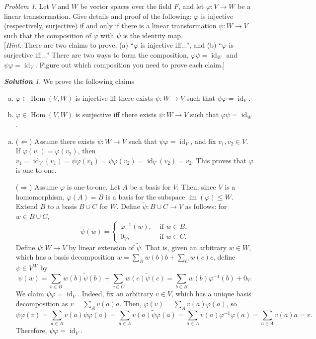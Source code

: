 \documentclass[11pt]{paper}
\theoremstyle{remark}
\newtheorem{problem}{Problem}
\newtheorem*{solution}{{\bf Solution}}
\newcommand\0{\ensuremath{\mathbf{0}}}
\newcommand{\<}{\ensuremath{\langle}}
\renewcommand{\>}{\ensuremath{\rangle}}
\newcommand\Hom{\ensuremath{\operatorname{Hom}}}
\newcommand{\id}{\ensuremath{\operatorname{id}}}
\newcommand\im[1]{\ensuremath{\operatorname{im}(#1)}}
\renewcommand{\phi}{\ensuremath{\varphi}}
\renewcommand{\leq}{\ensuremath{\leqslant}}
\begin{document}
\begin{problem}
Let $V$ and $W$ be vector spaces over the field $F$, and let 
$\phi : V \rightarrow W$ be a linear transformation. Give details and proof of
the following: $\phi$ is injective (respectively, surjective) if and only if 
there is a linear transformation $\psi: W \rightarrow V$ such that the
composition of $\phi$ with $\psi$ is the identity map.\\[4pt]
[{\it Hint:} There are two claims to prove, (a) ``$\phi$
  is injective iff...'', and (b) ``$\phi$ is surjective
  iff...'' There are two ways to form the composition, 
$\phi \psi = \id_W$ and $\psi \phi = \id_V$. Figure out which composition
you need to prove each claim.]
\end{problem}
\begin{solution} We prove the following claims 
  \begin{enumerate}[(a)]
  \item $\phi\in \Hom(V,W)$ is injective iff there exists $\psi: W\rightarrow V$ such that $\psi \phi = \id_V$.
  \item $\phi\in \Hom(V,W)$ is surjective iff there exists $\psi: W\rightarrow V$ such that $\phi \psi = \id_W$.
  \end{enumerate}
  \begin{enumerate}[(a)]
  \item ($\Leftarrow$) Assume there exists $\psi: W\rightarrow V$ such that
    $\psi \phi = \id_V$, and fix $v_1, v_2 \in V$. 
    If $\phi(v_1) = \phi(v_2)$, then $v_1 =  \id_V(v_1) = \psi \phi(v_1) =\psi \phi(v_2) =
    \id_V(v_2) =  v_2$. This proves that $\phi$ is one-to-one.

($\Rightarrow$) Assume $\phi$ is one-to-one.  Let $A$ be a basis for
    $V$.  Then, since $V$ is a homomorphism, $\phi(A) = B$ is a basis for the
    subspace $\im \phi \leq W$.  Extend $B$ to a basis $B\cup C$ for $W$.
    Define $\tilde{\psi}: B\cup C \rightarrow V$ as follows: for $w\in B\cup C$,
\[
\tilde\psi (w) =
\begin{cases}
  \phi^{-1}(w), & \text{ if $w \in B$,}\\
0_V, & \text{ if $w \in C$.}
\end{cases}
\]
Define $\psi: W \rightarrow V$ by linear extension of $\tilde \psi$.  That is,
given an arbitrary $w \in W$, which has a basis decomposition 
$w = \sum_B w(b) b +\sum_C w(c) c$, define $\psi \in V^W$ by 
\[
\psi(w) = \sum_{b\in B} w(b) \tilde{\psi}(b) +\sum_{c\in C} w(c)\tilde{\psi}(c)
 = \sum_{b\in B} w(b) \phi^{-1}(b) + 0_V.
\]
We claim $\psi \phi = \id_V$. Indeed, fix an arbitrary $v \in V$, which has
a unique basis decomposition as $v = \sum_A v(a) a$.  Then, $\phi(v)
= \sum_A v(a) \phi(a)$, so 
\[
\psi\phi(v) = 
\sum_{a\in A} v(a)\psi \phi(a) = 
\sum_{a\in A} v(a)\tilde{\psi} \phi(a) =
\sum_{a\in A} v(a)\phi^{-1}\phi(a)=
\sum_{a\in A} v(a)a = v.
\]
Therefore, $\psi \phi = \id_V$.


\end{enumerate}
\end{solution}
\end{document}
